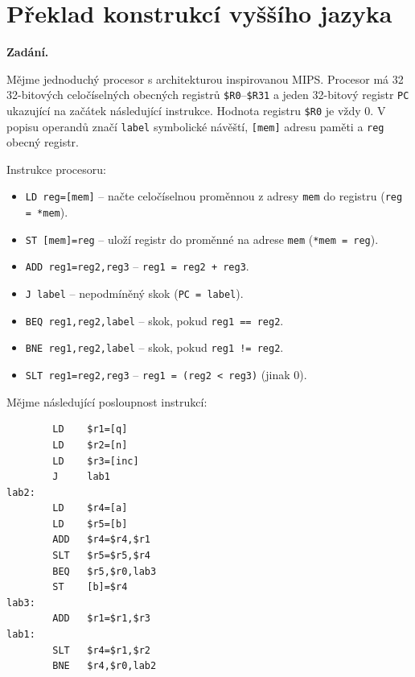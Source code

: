 \section{Překlad konstrukcí vyššího jazyka}

\noindent\textbf{Zadání.}\par
Mějme jednoduchý procesor s architekturou inspirovanou MIPS. Procesor má 32
32-bitových celočíselných obecných registrů \texttt{\$R0}--\texttt{\$R31} a jeden
32-bitový registr \texttt{PC} ukazující na začátek následující instrukce. Hodnota
registru \texttt{\$R0} je vždy 0. V popisu operandů značí \texttt{label} symbolické
návěští, \texttt{[mem]} adresu paměti a \texttt{reg} obecný registr.

\medskip
\noindent Instrukce procesoru:
\begin{itemize}
  \item \texttt{LD reg=[mem]} -- načte celočíselnou proměnnou z adresy \texttt{mem}
    do registru (\texttt{reg = *mem}).
  \item \texttt{ST [mem]=reg} -- uloží registr do proměnné na adrese \texttt{mem}
    (\texttt{*mem = reg}).
  \item \texttt{ADD reg1=reg2,reg3} -- \texttt{reg1 = reg2 + reg3}.
  \item \texttt{J label} -- nepodmíněný skok (\texttt{PC = label}).
  \item \texttt{BEQ reg1,reg2,label} -- skok, pokud \texttt{reg1 == reg2}.
  \item \texttt{BNE reg1,reg2,label} -- skok, pokud \texttt{reg1 != reg2}.
  \item \texttt{SLT reg1=reg2,reg3} -- \texttt{reg1 = (reg2 < reg3)} (jinak 0).
\end{itemize}

\medskip
\noindent Mějme následující posloupnost instrukcí:
\begin{lstlisting}
        LD    $r1=[q]
        LD    $r2=[n]
        LD    $r3=[inc]
        J     lab1
lab2:
        LD    $r4=[a]
        LD    $r5=[b]
        ADD   $r4=$r4,$r1
        SLT   $r5=$r5,$r4
        BEQ   $r5,$r0,lab3
        ST    [b]=$r4
lab3:
        ADD   $r1=$r1,$r3
lab1:
        SLT   $r4=$r1,$r2
        BNE   $r4,$r0,lab2
\end{lstlisting}


